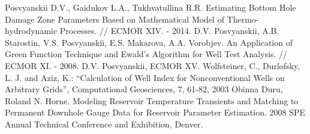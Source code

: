 \begin{thebibliography}{99}
 Posvyanskii D.V., Gaidukov L.A., Tukhvatullina R.R. Estimating Bottom Hole Damage Zone Parameters Based on Mathematical Model of Thermo-hydrodynamic Processes. // ECMOR XIV. - 2014.
 D.V. Posvyanskii, A.B. Starostin, V.S. Posvyanskii, E.S. Makarova, A.A. Vorobjev. An Application of Green Function Technique and Ewald's Algorithm for Well Test Analysis. // ECMOR XI. - 2008.
 D.V. Posvyanskii, ECMOR XV.
 Wolfsteiner, C., Durlofsky, L. J. and Aziz, K.: “Calculation of Well Index for Nonconventional Wells on Arbitrary Grids”, Computational Geosciences, 7, 61-82, 2003
 Obinna Duru, Roland N. Horne. Modeling Reservoir Temperature Transients and Matching to Permanent Downhole Gauge Data for Reservoir Parameter Estimation. 2008 SPE Annual Technical Conference and Exhibition, Denver.

\end{thebibliography}
	
